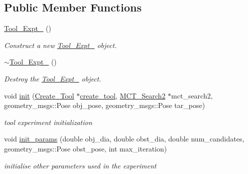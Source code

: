\subsection*{Public Member Functions}
\begin{DoxyCompactItemize}
\item 
\mbox{\label{classTool__Expt__2_a64e26303f2c9a3ee781be8b64e6263cf}} 
\hyperlink{classTool__Expt__2_a64e26303f2c9a3ee781be8b64e6263cf}{Tool\+\_\+\+Expt\+\_} ()
\begin{DoxyCompactList}\small\item\em Construct a new \hyperlink{classTool__Expt__2}{Tool\+\_\+\+Expt\+\_} object. \end{DoxyCompactList}\item 
\mbox{\label{classTool__Expt__2_a8c3e036e424c835e8df639457fe1b63e}} 
\hyperlink{classTool__Expt__2_a8c3e036e424c835e8df639457fe1b63e}{$\sim$\+Tool\+\_\+\+Expt\+\_} ()
\begin{DoxyCompactList}\small\item\em Destroy the \hyperlink{classTool__Expt__2}{Tool\+\_\+\+Expt\+\_} object. \end{DoxyCompactList}\item 
void \hyperlink{classTool__Expt__2_a13eb50ab5238d8280ab013faa16df365}{init} (\hyperlink{classCreate__Tool}{Create\+\_\+\+Tool} $\ast$\hyperlink{classTool__Expt_ae15dbe96d503e8c03cb86d9f8e58937c}{create\+\_\+tool}, \hyperlink{classMCT__Search2}{M\+C\+T\+\_\+\+Search2} $\ast$mct\+\_\+search2, geometry\+\_\+msgs\+::\+Pose obj\+\_\+pose, geometry\+\_\+msgs\+::\+Pose tar\+\_\+pose)
\begin{DoxyCompactList}\small\item\em tool experiment initialization \end{DoxyCompactList}\item 
void \hyperlink{classTool__Expt__2_ab6fdd7dd20018e9d90b12e6f14ea3911}{init\+\_\+params} (double obj\+\_\+dia, double obst\+\_\+dia, double num\+\_\+candidates, geometry\+\_\+msgs\+::\+Pose obst\+\_\+pose, int max\+\_\+iteration)
\begin{DoxyCompactList}\small\item\em initialise other parameters used in the experiment \end{DoxyCompactList}\item 
\mbox{\label{classTool__Expt__2_a3aa54fd0444cf6c21987c3e77470e110}} 

\end{DoxyCompactItemize}
